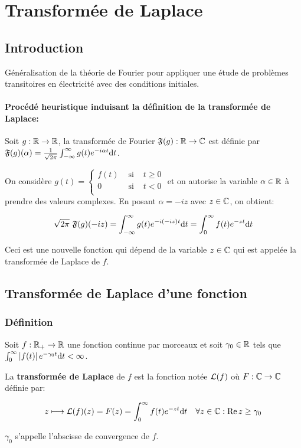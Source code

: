 \chapter{Transformée de Laplace}


\section{Introduction}

\begin{motivation}
    Généralisation de la théorie de Fourier pour appliquer une étude de problèmes transitoires en électricité avec des conditions initiales.
\end{motivation}

\subsubsection*{Procédé heuristique induisant la définition de la transformée de Laplace:}

Soit $g: \mathbb{R} \rightarrow \mathbb{R}$, la transformée de Fourier $\mathfrak{F} (g): \mathbb{R} \rightarrow \mathbb{C}$ est définie par $\mathfrak{F}(g)(\alpha) = \frac{1}{\sqrt{2 \pi}} \int_{-\infty}^{\infty} g(t) e^{-i\alpha t} \mathrm{d}t$.

On considère $g(t) = \left\{
\begin{array}{lcl}
f(t) & \textrm{ si } & t \geq 0\\
0    & \textrm{ si } & t < 0\\
\end{array}
\right.$ et on autorise la variable $\alpha \in \mathbb{R}$ à prendre des valeurs complexes.
En posant $\alpha = -i z$ avec $z \in \mathbb{C}$, on obtient:

\[ \sqrt{2\pi} \ \mathfrak{F}(g)(-iz) = \int_{-\infty}^{\infty} g(t) e^{-i(-iz)t} \mathrm{d}t = \int_{0}^{\infty} f(t) e^{-zt} \mathrm{d}t \]

Ceci est une nouvelle fonction qui dépend de la variable $z \in \mathbb{C}$ qui est appelée la transformée de Laplace de $f$.

\section{Transformée de Laplace d'une fonction}

\subsection{Définition}

\begin{definition}
    Soit $f: \mathbb{R}_+ \rightarrow \mathbb{R}$ une fonction continue par morceaux et soit $\gamma_0 \in \mathbb{R}$ tels que $\int_0^\infty \left|f(t)\right| e^{-\gamma_0 t} \mathrm{d}t < \infty$.
    
    La \textbf{transformée de Laplace} de $f$ est la fonction notée $\mathcal{L}(f)$ où $F: \mathbb{C} \rightarrow \mathbb{C}$ définie par:
    
    \[ z \longmapsto \mathcal{L}(f)(z) = F(z) = \int_0^\infty f(t) e^{-zt} \mathrm{d}t \quad \forall z \in \mathbb{C} : \operatorname{Re} z \geq \gamma_0 \]
    
    $\gamma_0$ s'appelle l'abscisse de convergence de $f$.
\end{definition}

